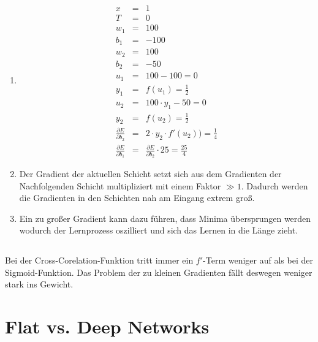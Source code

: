 \documentclass[DIN, pagenumber=false, fontsize=11pt, parskip=half]{scrartcl}
\begin{document}
    \subsection{}
    \begin{enumerate}[label=(\alph*)]
        \item 
            \begin{eqnarray*}
                x &=& 1 \\
                T &=& 0 \\
                w_1 &=& 100 \\
                b_1 &=& -100 \\
                w_2 &=& 100 \\
                b_2 &=& -50 \\
                u_1 &=& 100 - 100 = 0 \\
                y_1 &=& f(u_1) = \frac{1}{2} \\
                u_2 &=& 100 \cdot y_1 - 50 = 0 \\
                y_2 &=& f(u_2) = \frac{1}{2} \\
                \frac{\partial E}{\partial b_2} &=& 2 \cdot y_2 \cdot f'(u_2) ) = \frac{1}{4} \\
                \frac{\partial E}{\partial b_1} &=& \frac{\partial E}{\partial b_2} \cdot 25 = \frac{25}{4} 
            \end{eqnarray*}
        \item 
            Der Gradient der aktuellen Schicht setzt sich aus dem Gradienten der Nachfolgenden Schicht multipliziert mit einem Faktor $\gg1$. Dadurch werden die Gradienten in den Schichten nah am Eingang extrem groß.
        \item Ein zu großer Gradient kann dazu führen, dass Minima übersprungen werden wodurch der Lernprozess oszilliert und sich das Lernen in die Länge zieht.
    \end{enumerate}

    \subsection{}
    Bei der Cross-Corelation-Funktion tritt immer ein $f'$-Term weniger auf als bei der Sigmoid-Funktion. Das Problem der zu kleinen Gradienten fällt deswegen weniger stark ins Gewicht.
    \section{Flat vs. Deep Networks}
\end{document}
